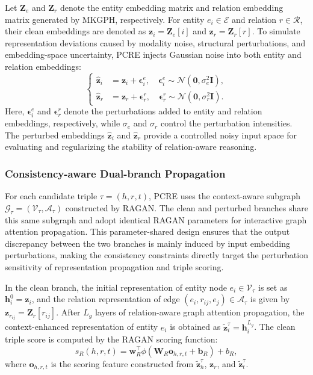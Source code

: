 \documentclass[pdflatex,sn-mathphys-num]{sn-jnl}
\begin{document}
Let $\mathbf{Z}_{e}$ and $\mathbf{Z}_{r}$ denote the entity embedding matrix and relation embedding matrix generated by MKGPH, respectively. For entity $e_i\in\mathcal{E}$ and relation $r\in\mathcal{R}$, their clean embeddings are denoted as $\mathbf{z}_i=\mathbf{Z}_{e}[i]$ and $\mathbf{z}_r=\mathbf{Z}_{r}[r]$. To simulate representation deviations caused by modality noise, structural perturbations, and embedding-space uncertainty, PCRE injects Gaussian noise into both entity and relation embeddings:
\begin{equation}
\left\{
\begin{aligned}
\widehat{\mathbf{z}}_i
&=
\mathbf{z}_i
+
\boldsymbol{\epsilon}_i^{e},
\quad
\boldsymbol{\epsilon}_i^{e}
\sim
\mathcal{N}(\mathbf{0},\sigma_{e}^{2}\mathbf{I}), \\
\widehat{\mathbf{z}}_r
&=
\mathbf{z}_r
+
\boldsymbol{\epsilon}_r^{r},
\quad
\boldsymbol{\epsilon}_r^{r}
\sim
\mathcal{N}(\mathbf{0},\sigma_{r}^{2}\mathbf{I}).
\end{aligned}
\right.
\end{equation}
Here, $\boldsymbol{\epsilon}_i^{e}$ and $\boldsymbol{\epsilon}_r^{r}$ denote the perturbations added to entity and relation embeddings, respectively, while $\sigma_e$ and $\sigma_r$ control the perturbation intensities. The perturbed embeddings $\widehat{\mathbf{z}}_i$ and $\widehat{\mathbf{z}}_r$ provide a controlled noisy input space for evaluating and regularizing the stability of relation-aware reasoning.

\subsubsection{Consistency-aware Dual-branch Propagation}

For each candidate triple $\tau=(h,r,t)$, PCRE uses the context-aware subgraph $\mathcal{G}_{\tau}=(\mathcal{V}_{\tau},\mathcal{A}_{\tau})$ constructed by RAGAN. The clean and perturbed branches share this same subgraph and adopt identical RAGAN parameters for interactive graph attention propagation. This parameter-shared design ensures that the output discrepancy between the two branches is mainly induced by input embedding perturbations, making the consistency constraints directly target the perturbation sensitivity of representation propagation and triple scoring.

In the clean branch, the initial representation of entity node $e_i\in\mathcal{V}_{\tau}$ is set as $\mathbf{h}_{i}^{0}=\mathbf{z}_{i}$, and the relation representation of edge $(e_i,r_{ij},e_j)\in\mathcal{A}_{\tau}$ is given by $\mathbf{z}_{r_{ij}}=\mathbf{Z}_{r}[r_{ij}]$. After $L_g$ layers of relation-aware graph attention propagation, the context-enhanced representation of entity $e_i$ is obtained as $\widetilde{\mathbf{z}}_{i}^{\tau}=\mathbf{h}_{i}^{L_g}$. The clean triple score is computed by the RAGAN scoring function:
\begin{equation}
s_R(h,r,t)
=
\mathbf{w}_{R}^{\top}
\phi
\left(
\mathbf{W}_{R}
\mathbf{o}_{h,r,t}
+
\mathbf{b}_{R}
\right)
+
b_{R},
\end{equation}
where $\mathbf{o}_{h,r,t}$ is the scoring feature constructed from $\widetilde{\mathbf{z}}_{h}^{\tau}$, $\mathbf{z}_{r}$, and $\widetilde{\mathbf{z}}_{t}^{\tau}$.
\end{document}
